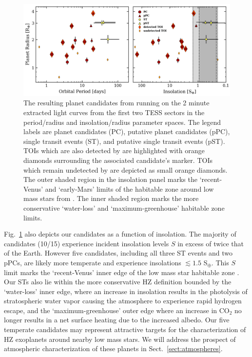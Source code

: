 \begin{figure}
  \centering
  \includegraphics[width=0.9\hsize]{figures/planetsample.png}
  \caption[Planetary parameters for the \texttt{ORION} planet candidate sample.]
          {The resulting planet candidates from running \pipeline{} on the 2 minute extracted light curves
    from the first two TESS sectors in the period/radius and insolation/radius parameter spaces.
    The legend labels are planet candidates (PC), putative planet candidates (pPC), 
    single transit events (ST), and putative single transit events (pST).
    TOIs which are also detected by \pipeline{} are highlighted with
    orange diamonds surrounding the associated candidate's marker. TOIs which remain undetected by \pipeline{}
    are depicted as small orange diamonds. %
    The outer shaded region in the insolation panel marks the `recent-Venus' and `early-Mars'
    limits of the habitable zone around low mass stars from \cite{kopparapu13}. The inner shaded region
    marks the more conservative `water-loss' and `maximum-greenhouse' habitable zone limits.}
  \label{fig:planets}
\end{figure}


Fig.~\ref{fig:planets} also depicts our candidates as a function of insolation. The majority of candidates
(10/15) experience incident insolation levels $S$ in excess of twice that of the Earth. However five candidates,
including all three ST events and two pPCs, are likely more temperate and experience insolations
$\lesssim 1.5$ S$_{\oplus}$.
This $S$ limit marks the `recent-Venus' inner edge of the low mass star habitable zone \citep[HZ;][]{kopparapu13}.
Our STs also lie within the more conservative HZ definition bounded by the `water-loss' inner
edge, where an increase in insolation results in the photolysis of stratospheric water vapor causing the atmosphere
to experience rapid hydrogen escape, and the `maximum-greenhouse' outer edge where an increase in CO$_2$ no longer
results in a net surface heating due to the increased albedo. Our five temperate candidates may represent attractive
targets for the characterization of HZ exoplanets around nearby low mass stars. We will address the prospect of
atmospheric characterization of these planets in Sect.~\ref{sect:atmospheres}. \\

